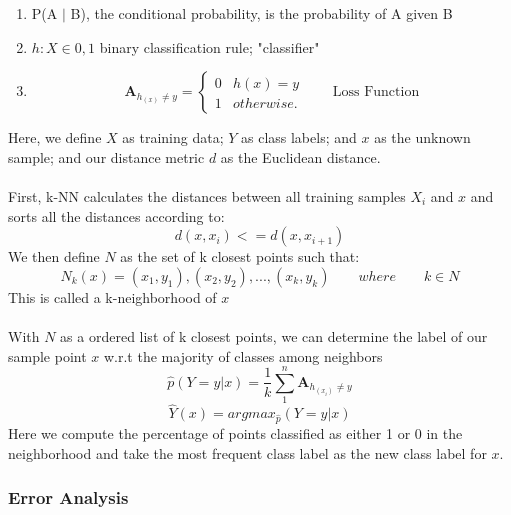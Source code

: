 \documentclass{report}
\begin{document}
\begin{enumerate}
	\item P(A $|$ B), the conditional probability, is the probability of A given B
	\item $h : X \in 0, 1$  \qquad  \qquad \textrm{binary classification rule; 
	"classifier" }
	\item \begin{equation*}
	  \textbf{A}_{h_(x) \neq y} = \begin{cases}
	        0 & h(x) = y 
	        \\ 
	        1 &  otherwise.
	        \end{cases} \qquad \textrm{Loss Function}
	 \end{equation*}
\end{enumerate}
Here, we define $X$ as training data; $Y$ as class labels; and $x$ as the unknown sample; and our distance metric $d$ as the Euclidean distance.
\\ \\
First, k-NN calculates the distances between all  training samples $X_{i}$ and $x$ and sorts all the distances according to:
\begin{equation}
d(x,x_{i}) <= d(x,x_{i+1})
\end{equation}
We then define $N$ as the set of k closest points such that:
\begin{equation}
N_{k}(x) = (x_{1}, y_{1}), (x_{2}, y_{2}), ... , (x_{k}, y_{k}) \qquad where \qquad k \in N
\end{equation} 
This is called a k-neighborhood of $x$  \\ \\
With $N$ as a ordered list of k closest points, we can determine the label of our sample point $x$ w.r.t the majority of classes among neighbors
\begin{equation*}
\hat{p}(Y = y | x) = \frac{1}{k} \sum_{1}^{n} \textbf{A}_{h_(x_{i}) \neq y} 
\end{equation*}
\begin{equation}
\hat{Y}(x) = argmax_{\hat{p}}(Y = y |x)
\end{equation}
Here we compute the percentage of points classified as either 1 or 0 in the neighborhood and take the most frequent class label as the new class label for $x$. \cite{5}
 \newline\newline
		
\subsubsection*{Error Analysis}
\end{document}

